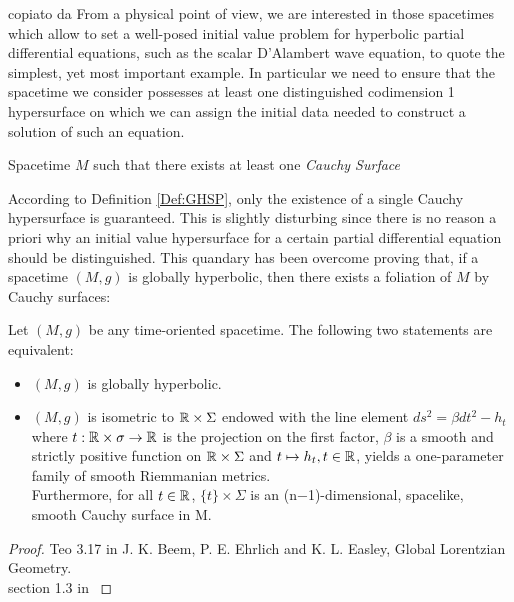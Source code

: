 \documentclass[a4paper,12pt]{scrartcl}    %
\begin{document}
		\begin{Warning}
		\danger copiato da \cite{primer}
		From a physical point of view, we are interested in those spacetimes which allow to set a well-posed
initial value problem for hyperbolic partial differential equations, such as the scalar D’Alambert wave equation, to quote the simplest, yet most important example. In particular we need to ensure that the spacetime we consider possesses at least one distinguished codimension 1 hypersurface on which we can assign the initial data needed to construct a solution of such an equation.	
		\end{Warning}	
		
		\begin{definition}\label{Def:GHSP}
			 Spacetime $M$ such that there exists at least one \emph{Cauchy Surface}
		\end{definition}
		
		According to Definition \ref{Def:GHSP}, only the existence of a single Cauchy hypersurface is guaranteed. 
		This is slightly disturbing since there is no reason a priori why an initial value hypersurface for a certain partial differential equation should be distinguished. 
		This quandary has been overcome proving that, if a spacetime $(M,g)$ is globally hyperbolic, then there exists a foliation of $M$ by Cauchy surfaces:
		
			\begin{theorem}\label{Teo:GHSC_character}
				Let $(M,g)$ be any time-oriented spacetime. The following two statements are equivalent:
				\begin{itemize}
					\item $(M,g)$ is globally hyperbolic.
					\item $(M,g)$ is isometric to $ \mathbb{R} \times \Sigma $ 
						endowed with the line element $ds^2 = \beta dt^2 - h_t$ 
						where $t : \mathbb{R} \times \sigma \rightarrow \mathbb{R}$ is the projection on the first factor, 
						$\beta$ is a smooth and strictly positive function on $\mathbb{R} \times \Sigma$ 
						and $t \mapsto h_t , t \in \mathbb{R}$, yields a one-parameter family of smooth Riemmanian metrics.\\
						Furthermore, for all $t\in \mathbb{R}$, $\{t\}\times \Sigma$ is an (n−1)-dimensional, spacelike, smooth Cauchy surface in M.
				\end{itemize}
			\end{theorem}
			\begin{proof}
				Teo 3.17 in J. K. Beem, P. E. Ehrlich and K. L. Easley, Global Lorentzian Geometry.
				\\
				section 1.3 in \cite{barwav}
			\end{proof}
\end{document}
